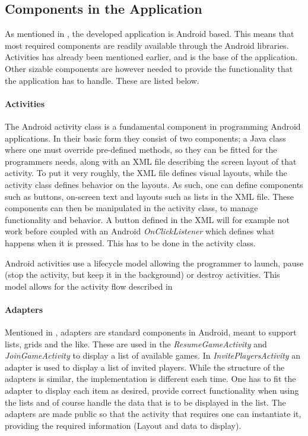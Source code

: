 \subsection{Components in the Application} \label{subsec:components}
As mentioned in , the developed application is Android based. This means that most required components are readily available through the Android libraries. Activities has already been mentioned earlier, and is the base of the application. Other sizable components are however needed to provide the functionality that the application has to handle. These are listed below.

\paragraph{Activities}
The Android activity class is a fundamental component in programming Android applications\cite{android-activity}. In their basic form they consist of two components; a Java class where one must override pre-defined methods, so they can be fitted for the programmers needs, along with an XML file describing the screen layout of that activity. To put it very roughly, the XML file defines visual layouts, while the activity class defines behavior on the layouts. As such, one can define components such as buttons, on-screen text and layouts such as lists in the XML file. These components can then be manipulated in the activity class, to manage functionality and behavior. A button defined in the XML will for example not work before coupled with an Android \textit{OnClickListener} which defines what happens when it is pressed. This has to be done in the activity class.

Android activities use a lifecycle model allowing the programmer to launch, pause (stop the activity, but keep it in the background) or destroy activities. This model allows for the activity flow described in 

\paragraph{Adapters}
Mentioned in , adapters are standard components in Android, meant to support lists, grids and the like. These are used in the \textit{ResumeGameActivity} and \textit{JoinGameActivity} to display a list of available games. In \textit{InvitePlayersActivity} an adapter is used to display a list of invited players. While the structure of the adapters is similar, the implementation is different each time. One has to fit the adapter to display each item as desired, provide correct functionality when using the lists and of course handle the data that is to be displayed in the list. The adapters are made public so that the activity that requires one can instantiate it, providing the required information (Layout and data to display).

